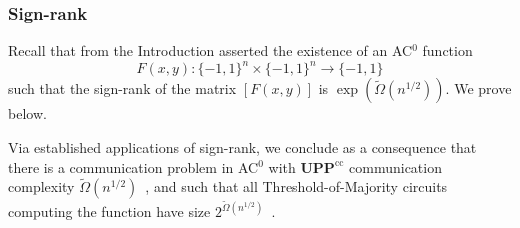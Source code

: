 \documentclass{toc}
\newcommand{\bits}{\{-1,1\}}
\newcommand{\UPP}{\mathbf{UPP}}
\begin{document}
\subsubsection{Sign-rank}
Recall that  from the 
%
Introduction %
asserted the existence of an AC$^0$ function
%
\[ F(x, y) \colon \bits^n \times \bits^n \to \bits \]
such that the sign-rank of the matrix $[F(x, y)]$ is
 $\exp(\tilde{\Omega}(n^{1/2}))$.
We prove  below.

Via established applications of sign-rank, we conclude as a consequence that there is a communication problem in AC$^0$ 
with $\UPP^{\text{cc}}$ communication complexity $\tilde{\Omega}(n^{1/2})$~\cite{paturisimon}, and such that all
Threshold-of-Majority circuits computing the function have size $2^{\tilde{\Omega}(n^{1/2})}$~\cite{forstertm}. 
\end{document}
